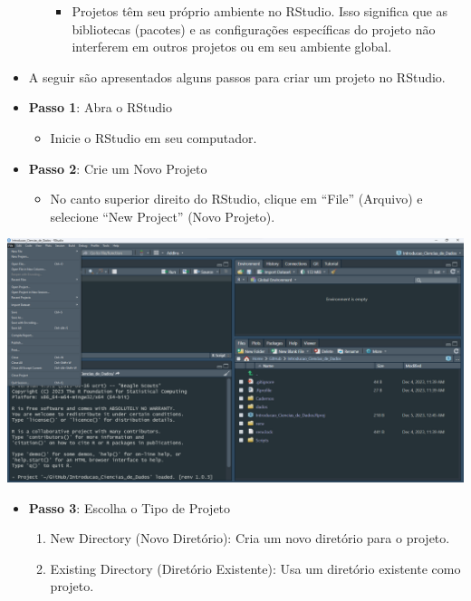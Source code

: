 \documentclass[
  letterpaper,
  DIV=11,
  numbers=noendperiod]{scrartcl}
\providecommand{\tightlist}{%
  \setlength{\itemsep}{0pt}\setlength{\parskip}{0pt}}\usepackage{longtable,booktabs,array}
\begin{document}
\begin{itemize}
\begin{enumerate}
    \begin{itemize}
    \tightlist
    \item
      Projetos têm seu próprio ambiente no RStudio. Isso significa que
      as bibliotecas (pacotes) e as configurações específicas do projeto
      não interferem em outros projetos ou em seu ambiente global.
    \end{itemize}
  \end{enumerate}
\item
  A seguir são apresentados alguns passos para criar um projeto no
  RStudio.
\item
  \textbf{Passo 1}: Abra o RStudio

  \begin{itemize}
  \tightlist
  \item
    Inicie o RStudio em seu computador.
  \end{itemize}
\item
  \textbf{Passo 2}: Crie um Novo Projeto

  \begin{itemize}
  \tightlist
  \item
    No canto superior direito do RStudio, clique em ``File'' (Arquivo) e
    selecione ``New Project'' (Novo Projeto).
  \end{itemize}
\end{itemize}

\includegraphics[width=1\textwidth,height=\textheight]{Figuras/proj_1.png}

\begin{itemize}
\item
  \textbf{Passo 3}: Escolha o Tipo de Projeto

  \begin{enumerate}
  \def\labelenumi{\arabic{enumi}.}
  \item
    New Directory (Novo Diretório): Cria um novo diretório para o
    projeto.
  \item
    Existing Directory (Diretório Existente): Usa um diretório existente
    como projeto.
  \end{enumerate}
\end{itemize}
\end{document}
